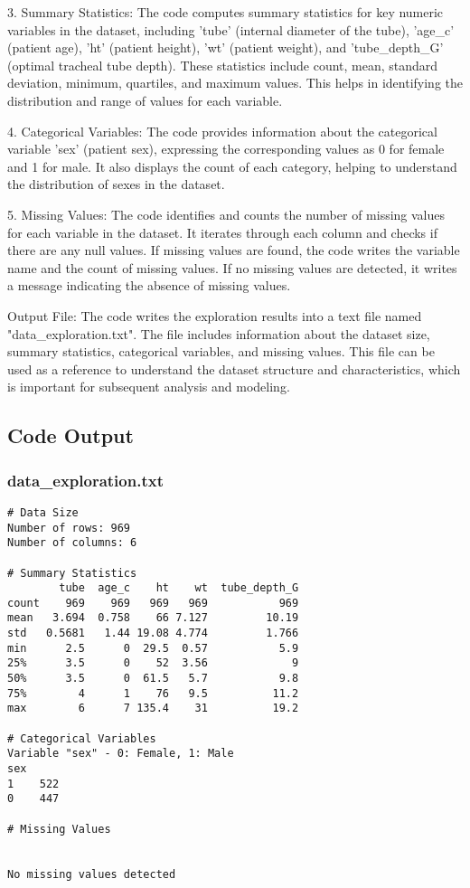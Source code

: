 \documentclass[11pt]{article}
\begin{document}
3. Summary Statistics:
   The code computes summary statistics for key numeric variables in the dataset, including 'tube' (internal diameter of the tube), 'age\_c' (patient age), 'ht' (patient height), 'wt' (patient weight), and 'tube\_depth\_G' (optimal tracheal tube depth). These statistics include count, mean, standard deviation, minimum, quartiles, and maximum values. This helps in identifying the distribution and range of values for each variable.

4. Categorical Variables:
   The code provides information about the categorical variable 'sex' (patient sex), expressing the corresponding values as 0 for female and 1 for male. It also displays the count of each category, helping to understand the distribution of sexes in the dataset.

5. Missing Values:
   The code identifies and counts the number of missing values for each variable in the dataset. It iterates through each column and checks if there are any null values. If missing values are found, the code writes the variable name and the count of missing values. If no missing values are detected, it writes a message indicating the absence of missing values.

Output File:
The code writes the exploration results into a text file named "data\_exploration.txt". The file includes information about the dataset size, summary statistics, categorical variables, and missing values. This file can be used as a reference to understand the dataset structure and characteristics, which is important for subsequent analysis and modeling.

\subsection{Code Output}

\subsubsection*{data\_exploration.txt}

\begin{Verbatim}[tabsize=4]
# Data Size
Number of rows: 969
Number of columns: 6

# Summary Statistics
        tube  age_c    ht    wt  tube_depth_G
count    969    969   969   969           969
mean   3.694  0.758    66 7.127         10.19
std   0.5681   1.44 19.08 4.774         1.766
min      2.5      0  29.5  0.57           5.9
25%      3.5      0    52  3.56             9
50%      3.5      0  61.5   5.7           9.8
75%        4      1    76   9.5          11.2
max        6      7 135.4    31          19.2

# Categorical Variables
Variable "sex" - 0: Female, 1: Male
sex
1    522
0    447

# Missing Values


No missing values detected

\end{Verbatim}
\end{document}
